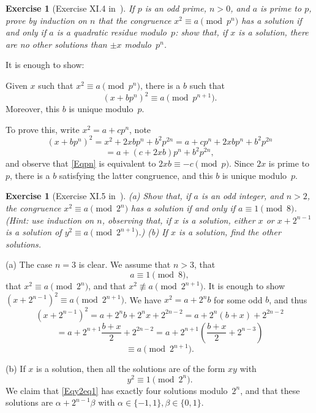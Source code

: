 \documentclass[12pt,letterpaper]{article}
\newtheorem{exer}[thm]{Exercise}
\theoremstyle{definition}
\begin{document}
\begin{exer}[Exercise XI.4 in~\cite{weil1979}]\label{ExXI4}
If $p$ is an odd prime, $n>0$, and $a$ is prime to $p$, prove by induction on $n$ that the congruence $x^2\equiv a\pmod{p^n}$ has a solution if and only if $a$ is a quadratic residue modulo~$p$: show that, if $x$ is a solution, there are no other solutions than $\pm x$ modulo~$p^n$.
\end{exer}

It is enough to show: 

Given $x$ such that $x^2\equiv a\pmod{p^n}$, there is a $b$ such that 
\begin{equation}\label{Eqpn}
(x+bp^n)^2\equiv a\pmod{p^{n+1}}.
\end{equation} 
Moreover, this $b$ is unique modulo~$p$. 

To prove this, write $x^2=a+cp^n$, note 
$$
(x+bp^n)^2=x^2+2xbp^n+b^2p^{2n}=a+cp^n+2xbp^n+b^2p^{2n}
$$ 
$$
=a+(c+2xb)p^n+b^2p^{2n},
$$ 
and observe that \eqref{Eqpn} is equivalent to $2xb\equiv-c\pmod p$. Since $2x$ is prime to $p$, there is a $b$ satisfying the latter congruence, and this $b$ is unique modulo~$p$. 

\begin{exer}[Exercise XI.5 in~\cite{weil1979}]\label{ExXI5}
\emph{(a)} Show that, if $a$ is an odd integer, and $n>2$, the congruence $x^2\equiv a\pmod{2^n}$ has a solution if and only if $a\equiv 1\pmod 8$. (Hint: use induction on $n$, observing that, if $x$ is a solution, either $x$ or $x+2^{n-1}$ is a solution of $y^2\equiv a\pmod{2^{n+1}}$.) \emph{(b)} If $x$ is a solution, find the other solutions.
\end{exer}

(a) The case $n=3$ is clear. We assume that $n>3$, that 
$$
a\equiv 1\pmod 8,
$$ 
that $x^2\equiv a\pmod{2^n}$, and that $x^2\not\equiv a\pmod{2^{n+1}}$. It is enough to show $(x+2^{n-1})^2\equiv a\pmod{2^{n+1}}$. We have $x^2=a+2^nb$ for some odd $b$, and thus 
$$
(x+2^{n-1})^2=a+2^nb+2^nx+2^{2n-2}=a+2^n(b+x)+2^{2n-2}
$$ 
$$
=a+2^{n+1}\frac{b+x}{2}+2^{2n-2}=a+2^{n+1}\left(\frac{b+x}{2}+2^{n-3}\right)
$$ 
$$
\equiv a\pmod{2^{n+1}}.
$$ 

(b) If $x$ is a solution, then all the solutions are of the form $xy$ with 
\begin{equation}\label{Eqy2eq1}
y^2\equiv 1\pmod{2^n}.
\end{equation} 
We claim that \eqref{Eqy2eq1} has exactly four solutions modulo~$2^n$, and that these solutions are $\alpha+2^{n-1}\beta$ with $\alpha \in \{-1,1\}, \beta \in \{0,1\}$. 
\end{document}
